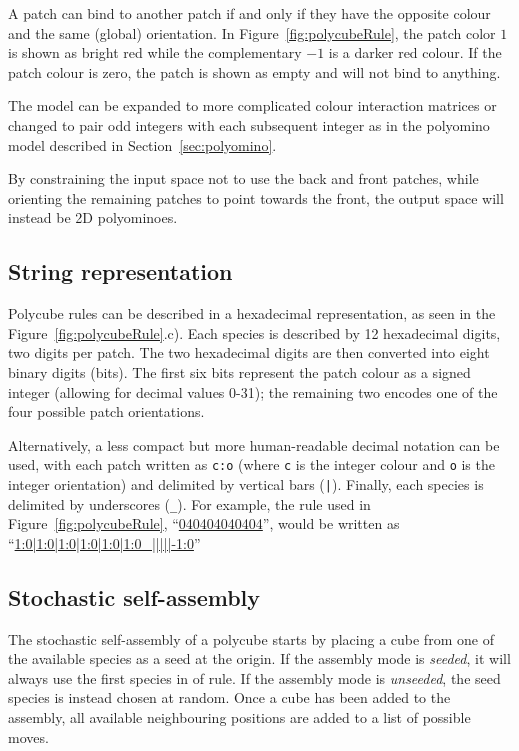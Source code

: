 A patch can bind to another patch if and only if they have the opposite colour and the same (global) orientation. In Figure~\ref{fig:polycubeRule}, the patch color \(1\) is shown as bright red while the complementary \(-1\) is a darker red colour.  If the patch colour is zero, the patch is shown as empty and will not bind to anything.

The model can be expanded to more complicated colour interaction matrices or changed to pair odd integers with each subsequent integer as in the polyomino model \cite{ahnert2010self,johnston2011evolutionary} described in Section~\ref{sec:polyomino}.

By constraining the input space not to use the back and front patches, while orienting the remaining patches to point towards the front, the output space will instead be 2D polyominoes.

\subsection{String representation}

Polycube rules can be described in a hexadecimal representation, as seen in the Figure~\ref{fig:polycubeRule}.c). Each species is described by 12 hexadecimal digits, two digits per patch. The two hexadecimal digits are then converted into eight binary digits (bits). The first six bits represent the patch colour as a signed integer (allowing for decimal values 0-31); the remaining two encodes one of the four possible patch orientations.

Alternatively, a less compact but more human-readable decimal notation can be used, with each patch written as \texttt{c:o} (where \texttt{c} is the integer colour and \texttt{o} is the integer orientation) and delimited by vertical bars (\texttt{|}). Finally, each species is delimited by underscores (\texttt{\_}). For example, the rule used in Figure~\ref{fig:polycubeRule}, ``\href{https://akodiat.github.io/polycubes?rule=040404040404000000000084}{040404040404}'', would be written as ``\href{https://akodiat.github.io/polycubes?decRule=1:0|1:0|1:0|1:0|1:0|1:0_|||||-1:0}{1:0|1:0|1:0|1:0|1:0|1:0\_|||||-1:0}''

\subsection{Stochastic self-assembly}
\label{sec:stochastic_assembly}

The stochastic self-assembly of a polycube starts by placing a cube from one of the available species as a seed at the origin. If the assembly mode is \emph{seeded}, it will always use the first species in of rule. If the assembly mode is \emph{unseeded}, the seed species is instead chosen at random. Once a cube has been added to the assembly, all available neighbouring positions are added to a list of possible moves.

